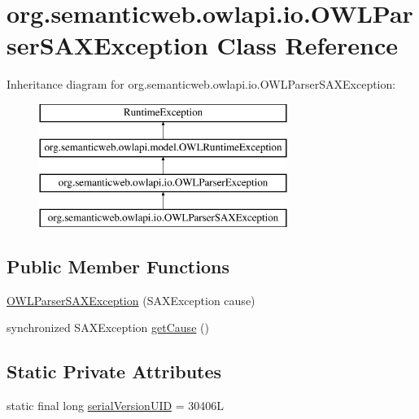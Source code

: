 \hypertarget{classorg_1_1semanticweb_1_1owlapi_1_1io_1_1_o_w_l_parser_s_a_x_exception}{\section{org.\-semanticweb.\-owlapi.\-io.\-O\-W\-L\-Parser\-S\-A\-X\-Exception Class Reference}
\label{classorg_1_1semanticweb_1_1owlapi_1_1io_1_1_o_w_l_parser_s_a_x_exception}
}
Inheritance diagram for org.\-semanticweb.\-owlapi.\-io.\-O\-W\-L\-Parser\-S\-A\-X\-Exception\-:\begin{figure}[H]
\begin{center}
\leavevmode
\includegraphics[height=4.000000cm]{classorg_1_1semanticweb_1_1owlapi_1_1io_1_1_o_w_l_parser_s_a_x_exception}
\end{center}
\end{figure}
\subsection*{Public Member Functions}
\begin{DoxyCompactItemize}
\item 
\hyperlink{classorg_1_1semanticweb_1_1owlapi_1_1io_1_1_o_w_l_parser_s_a_x_exception_a91ee9c5221b90951f5c99fa4d57677d4}{O\-W\-L\-Parser\-S\-A\-X\-Exception} (S\-A\-X\-Exception cause)
\item 
synchronized S\-A\-X\-Exception \hyperlink{classorg_1_1semanticweb_1_1owlapi_1_1io_1_1_o_w_l_parser_s_a_x_exception_a6850afc8d764a82a618f97a561782d40}{get\-Cause} ()
\end{DoxyCompactItemize}
\subsection*{Static Private Attributes}
\begin{DoxyCompactItemize}
\item 
static final long \hyperlink{classorg_1_1semanticweb_1_1owlapi_1_1io_1_1_o_w_l_parser_s_a_x_exception_ae17d75a4bd16dbbc19cafda881d9bc4f}{serial\-Version\-U\-I\-D} = 30406\-L
\end{DoxyCompactItemize}


